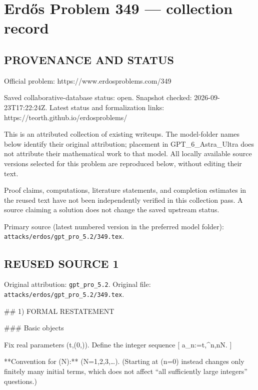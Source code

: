 \section*{Erd\H{o}s Problem 349 --- collection record}

\subsection*{PROVENANCE AND STATUS}
Official problem: https://www.erdosproblems.com/349

Saved collaborative-database status: open.
Snapshot checked: 2026-09-23T17:22:24Z.
Latest status and formalization links: https://teorth.github.io/erdosproblems/

This is an attributed collection of existing writeups. The model-folder names below identify their original attribution; placement in GPT\_6\_Astra\_Ultra does not attribute their mathematical work to that model. All locally available source versions selected for this problem are reproduced below, without editing their text.

Proof claims, computations, literature statements, and completion estimates in the reused text have not been independently verified in this collection pass. A source claiming a solution does not change the saved upstream status.

Primary source (latest numbered version in the preferred model folder): \texttt{attacks/erdos/gpt\_pro\_5.2/349.tex}.

\subsection*{REUSED SOURCE 1}
Original attribution: \texttt{gpt\_pro\_5.2}.
Original file: \texttt{attacks/erdos/gpt\_pro\_5.2/349.tex}.

## 1) FORMAL RESTATEMENT

### Basic objects

Fix real parameters (t,\alpha\in(0,\infty)). Define the integer sequence
[
a_n:=\big\lfloor t,\alpha^n\big\rfloor,\qquad n\in\mathbb N.
]

**Convention for (\mathbb N):** (\mathbb N={1,2,3,\dots}).
(Starting at (n=0) instead changes only finitely many initial terms, which does not affect “all sufficiently large integers” questions.)

